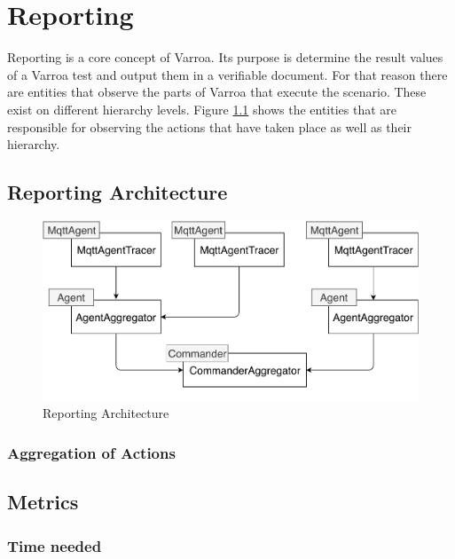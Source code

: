 \chapter{Reporting}
Reporting is a core concept of Varroa.
Its purpose is determine the result values of a Varroa test and output them in a verifiable document.
For that reason there are entities that observe the parts of Varroa that execute the scenario.
These exist on different hierarchy levels.
Figure \ref{fig:ReportingArchitecture} shows the entities that are responsible for observing the actions that have taken place as well as their hierarchy.

\section{Reporting Architecture}
\begin{figure}[H]
	\begin{center}
		\includegraphics[scale=0.8]{Resources/PDF/ReportingArchitecture}
		\caption{Reporting Architecture}
		\label{fig:ReportingArchitecture}
	\end{center}
\end{figure}



\subsection{Aggregation of Actions}

\section{Metrics}

\subsection{Time needed}



